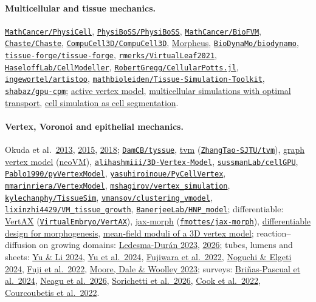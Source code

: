 \documentclass[11pt]{article}
\newcommand{\ghrepo}[2]{\href{https://github.com/#1/#2}{\texttt{#1/\allowbreak#2}}}
\begin{document}
\paragraph{Multicellular and tissue mechanics.}
\ghrepo{MathCancer}{PhysiCell},
\ghrepo{PhysiBoSS}{PhysiBoSS},
\ghrepo{MathCancer}{BioFVM},
\ghrepo{Chaste}{Chaste},
\ghrepo{CompuCell3D}{CompuCell3D},
\href{https://morpheus.gitlab.io}{Morpheus},
\ghrepo{BioDynaMo}{biodynamo},
\ghrepo{tissue-forge}{tissue-forge},
\ghrepo{rmerks}{VirtualLeaf2021},
\ghrepo{HaseloffLab}{CellModeller},
\ghrepo{RobertGregg}{CellularPotts.jl},
\ghrepo{ingewortel}{artistoo},
\ghrepo{mathbioleiden}{Tissue-Simulation-Toolkit},
\ghrepo{shabaz}{gpu-cpm};
\href{https://doi.org/10.1371/journal.pcbi.1005569}{active vertex model},
\href{https://arxiv.org/abs/2402.17086}{multicellular simulations with optimal transport},
\href{https://doi.org/10.1038/s41592-025-02697-0}{cell simulation as cell segmentation}.

\paragraph{Vertex, Voronoi and epithelial mechanics.}
Okuda et al.\
\href{https://doi.org/10.1007/s10237-012-0430-7}{2013},
\href{https://doi.org/10.2142/biophysico.12.0_13}{2015},
\href{https://doi.org/10.1038/s41598-018-20678-6}{2018};
\ghrepo{DamCB}{tyssue},
\href{https://arxiv.org/abs/2204.07081}{tvm} (\ghrepo{ZhangTao-SJTU}{tvm}),
\href{https://arxiv.org/abs/2309.04818}{graph vertex model} (\href{https://gitlab.com/ijskrajncgroup1/neovm}{neoVM}),
\ghrepo{alihashmiii}{3D-Vertex-Model},
\ghrepo{sussmanLab}{cellGPU},
\ghrepo{Pablo1990}{pyVertexModel},
\ghrepo{yasuhiroinoue}{PyCellVertex},
\ghrepo{mmarinriera}{VertexModel},
\ghrepo{mshagirov}{vertex_simulation},
\ghrepo{kylechanphy}{TissueSim},
\ghrepo{vmansov}{clustering_vmodel},
\ghrepo{lixinzhi4429}{VM_tissue_growth},
\ghrepo{BanerjeeLab}{HNP_model};
differentiable:
\href{https://arxiv.org/abs/2604.06896}{VertAX} (\ghrepo{VirtualEmbryo}{VertAX}),
\href{https://arxiv.org/abs/2407.06295}{jax-morph} (\ghrepo{fmottes}{jax-morph}),
\href{https://doi.org/10.64898/2026.07.02.736195}{differentiable design for morphogenesis},
\href{https://arxiv.org/abs/2308.12892}{mean-field moduli of a 3D vertex model};
reaction--diffusion on growing domains:
\href{https://arxiv.org/abs/2308.12196}{Ledesma-Dur\'an 2023},
\href{https://doi.org/10.3934/mbe.2026005}{2026};
tubes, lumens and sheets:
\href{https://doi.org/10.1007/s10409-023-23297-x}{Yu \& Li 2024},
\href{https://doi.org/10.1126/sciadv.adn0172}{Yu et al.\ 2024},
\href{https://doi.org/10.3389/fcell.2022.932814}{Fujiwara et al.\ 2022},
\href{https://arxiv.org/abs/2407.13187}{Noguchi \& Elgeti 2024},
\href{https://hal.science/hal-03835943}{Fuji et al.\ 2022},
\href{https://arxiv.org/abs/2209.06753}{Moore, Dale \& Woolley 2023};
surveys:
\href{https://doi.org/10.3390/biophysica4040039}{Bri\~nas-Pascual et al.\ 2024},
\href{https://doi.org/10.3390/cells15020177}{Neagu et al.\ 2026},
\href{https://arxiv.org/abs/2604.13827}{Sorichetti et al.\ 2026},
\href{https://doi.org/10.1007/s11538-021-00968-3}{Cook et al.\ 2022},
\href{https://doi.org/10.1371/journal.pcbi.1009952}{Courcoubetis et al.\ 2022}.
\end{document}
